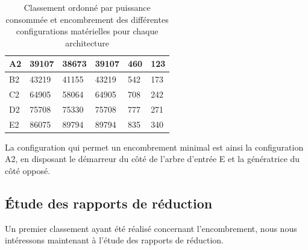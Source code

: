 \documentclass{config}
\begin{document}
\begin{spacing}{1.2}
\begin{table}[h!]
{\begin{tabular}{llllll}
\multicolumn{1}{|l|}{A2}            & \multicolumn{1}{l|}{39107}                                 & \multicolumn{1}{l|}{38673}                                 & \multicolumn{1}{l|}{39107}                & \multicolumn{1}{l|}{460}                 & \multicolumn{1}{l|}{123}                 \\ \hline
\multicolumn{1}{|l|}{B2}            & \multicolumn{1}{l|}{43219}                                 & \multicolumn{1}{l|}{41155}                                 & \multicolumn{1}{l|}{43219}                & \multicolumn{1}{l|}{542}                 & \multicolumn{1}{l|}{173}                 \\ \hline
\multicolumn{1}{|l|}{C2}            & \multicolumn{1}{l|}{64905}                                 & \multicolumn{1}{l|}{58064}                                 & \multicolumn{1}{l|}{64905}                & \multicolumn{1}{l|}{708}                 & \multicolumn{1}{l|}{242}                 \\ \hline
\multicolumn{1}{|l|}{D2}            & \multicolumn{1}{l|}{75708}                                 & \multicolumn{1}{l|}{75330}                                 & \multicolumn{1}{l|}{75708}                & \multicolumn{1}{l|}{777}                 & \multicolumn{1}{l|}{271}                 \\ \hline
\multicolumn{1}{|l|}{E2}            & \multicolumn{1}{l|}{86075}                                 & \multicolumn{1}{l|}{89794}                                 & \multicolumn{1}{l|}{89794}                & \multicolumn{1}{l|}{835}                 & \multicolumn{1}{l|}{340}                 \\ \hline
\end{tabular}%
}
\caption{Classement ordonné par puissance consommée et encombrement des différentes configurations matérielles pour chaque architecture}
\end{table}

La configuration qui permet un encombrement minimal est ainsi la configuration A2, en disposant le démarreur du côté de l'arbre d'entrée E et la génératrice du côté opposé.

\newpage
\subsection{Étude des rapports de réduction}

Un premier classement ayant été réalisé concernant l'encombrement, nous nous intéressons maintenant à l'étude des rapports de réduction. 


\end{spacing}
\end{document}
